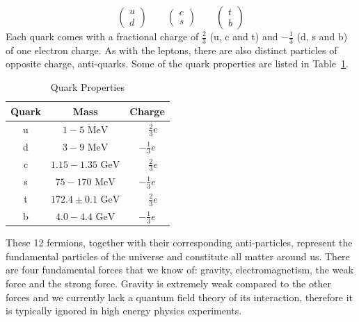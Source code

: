 \begin{equation}
\label{eqn:quark_flavor_doublets}
\begin{pmatrix} u \\ d \end{pmatrix} \qquad
\begin{pmatrix} c \\ s \end{pmatrix} \qquad
\begin{pmatrix} t \\ b \end{pmatrix}
\end{equation}
Each quark comes with a fractional charge of $\frac{2}{3}$ (u, c and t) and $-\frac{1}{3}$ (d, s and b) of one electron charge. As with the leptons, there are also distinct particles of opposite charge, anti-quarks. Some of the quark properties are listed in Table~\ref{table:theory:quarkprop}.
\begin{table}
\begin{center}
\begin{tabular}{|c|c|c|}%
\hline
Quark & Mass & Charge \\%
\hline
u & $1-5 \mbox{ MeV}$         & $\phantom{-}\frac{2}{3} e$  \\%
d & $3-9 \mbox{ MeV}$         & $-\frac{1}{3} e$            \\%
c & $1.15-1.35 \mbox{ GeV}$   & $\phantom{-}\frac{2}{3} e$  \\%
s & $75-170 \mbox{ MeV}$      & $-\frac{1}{3}e$             \\%
t & $172.4\pm 0.1 \mbox{ GeV}$ & $\phantom{-}\frac{2}{3} e$  \\%
b & $4.0-4.4 \mbox{ GeV}$     & $-\frac{1}{3} e$            \\%
\hline
\end{tabular}
\end{center}
\caption{Quark Properties}
\label{table:theory:quarkprop}
\end{table}
\par These 12 fermions, together with their corresponding anti-particles, represent the fundamental particles of the universe and constitute all matter around us. There are four fundamental forces that we know of: gravity, electromagnetism, the weak force and the strong force. Gravity is extremely weak compared to the other forces and we currently lack a quantum field theory of its interaction, therefore it is typically ignored in high energy physics experiments. 
